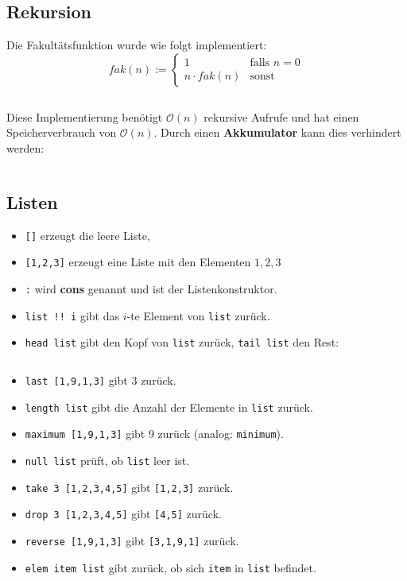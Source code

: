 \inputminted[numbersep=5pt, tabsize=4]{haskell}{scripts/haskell/binomialkoeffizient-guard.hs}

\subsection{Rekursion}
Die Fakultätsfunktion wurde wie folgt implementiert:
\[fak(n) := \begin{cases}
        1              &\text{falls } n=0\\
        n \cdot fak(n) &\text{sonst}
    \end{cases}\]
\inputminted[numbersep=5pt, tabsize=4]{haskell}{scripts/haskell/fakultaet.hs}

Diese Implementierung benötigt $\mathcal{O}(n)$ rekursive Aufrufe und
hat einen Speicherverbrauch von $\mathcal{O}(n)$. Durch einen
\textbf{Akkumulator} kann dies verhindert werden:
\inputminted[numbersep=5pt, tabsize=4]{haskell}{scripts/haskell/fakultaet-akkumulator.hs}

\subsection{Listen}
\begin{itemize}
    \item \texttt{[]} erzeugt die leere Liste,
    \item \texttt{[1,2,3]} erzeugt eine Liste mit den Elementen $1, 2, 3$
    \item \texttt{:} wird \textbf{cons} genannt und ist
          der Listenkonstruktor.
    \item \texttt{list !! i} gibt das $i$-te Element von \texttt{list} zurück.
    \item \texttt{head list} gibt den Kopf von \texttt{list} zurück,
          \texttt{tail list} den Rest:
          \inputminted[numbersep=5pt, tabsize=4]{haskell}{scripts/haskell/list-basic.sh}
    \item \texttt{last [1,9,1,3]} gibt 3 zurück.
    \item \texttt{length list} gibt die Anzahl der Elemente in \texttt{list} zurück.
    \item \texttt{maximum [1,9,1,3]} gibt 9 zurück (analog: \texttt{minimum}).
    \item \texttt{null list} prüft, ob \texttt{list} leer ist.
    \item \texttt{take 3 [1,2,3,4,5]} gibt \texttt{[1,2,3]} zurück.
    \item \texttt{drop 3 [1,2,3,4,5]} gibt \texttt{[4,5]} zurück.
    \item \texttt{reverse [1,9,1,3]} gibt \texttt{[3,1,9,1]} zurück.
    \item \texttt{elem item list} gibt zurück, ob sich \texttt{item} in \texttt{list} befindet.
\end{itemize}

